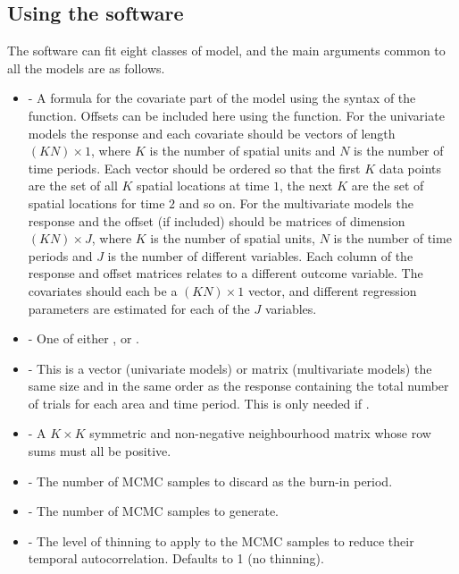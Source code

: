 \documentclass[article, nojss]{jss}
\begin{document}
\subsection{Using the software}
The software can fit  eight classes of model, and the main arguments common to all the models are as follows.

\begin{itemize}
\item {} - A formula for the covariate part of the model using the syntax of the  function. Offsets can be included here using the  function. For the univariate models the response and each covariate should be vectors of length $(KN)\times 1$, where $K$ is the number of spatial units and $N$ is the number of time periods. Each vector should be ordered so that the first $K$ data points are the set of all $K$ spatial locations at time $1$, the next $K$ are the set of spatial locations for time $2$ and so on. For the multivariate models the response and the offset (if included) should be matrices of dimension $(KN)\times J$, where $K$ is  the number of spatial units, $N$ is the number of time periods and $J$ is the number  of different variables. Each column of the response and offset matrices relates to a different outcome variable. The  covariates should each be a $(KN)\times 1$ vector, and different regression parameters are  estimated for each of the $J$ variables.

\item {} - One of either ,  or .


\item {} - This is a vector (univariate models) or matrix (multivariate models) the same size and in the same order as the response containing the total number of trials  for each area and time period. This is only needed if  .

\item {} - A $K \times K$ symmetric and non-negative neighbourhood matrix whose row sums must all be positive.

\item {} - The number of MCMC samples to discard as the burn-in period.
    
\item {} - The number of MCMC samples to generate.

\item {} - The level of thinning to apply to the MCMC samples to reduce their temporal 
autocorrelation. Defaults to 1 (no thinning).
\end{itemize}
\end{document}

